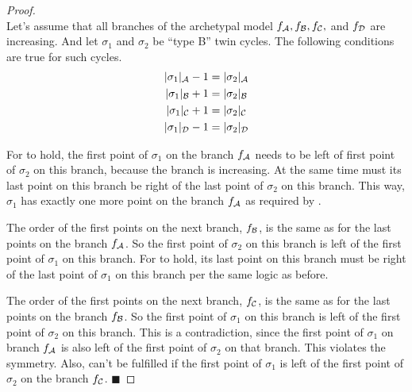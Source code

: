 \begin{proof} \phantom{x} \\
	Let's assume that all branches of the archetypal model $f_{\mathcal{A}}, f_{\mathcal{B}}, f_{\mathcal{C}},$ and $f_{\mathcal{D}}$ are increasing.
	And let $\sigma_1$ and $\sigma_2$ be ``type B'' twin cycles.
	The following conditions are true for such cycles.
	\begin{subequations}
		\begin{align}
			|\sigma_1|_{\mathcal{A}} - 1 & = |\sigma_2|_{\mathcal{A}} \label{equ:add.change.conseq.sigmaA} \\
			|\sigma_1|_{\mathcal{B}} + 1 & = |\sigma_2|_{\mathcal{B}} \label{equ:add.change.conseq.sigmaB} \\
			|\sigma_1|_{\mathcal{C}} + 1 & = |\sigma_2|_{\mathcal{C}} \label{equ:add.change.conseq.sigmaC} \\
			|\sigma_1|_{\mathcal{D}} - 1 & = |\sigma_2|_{\mathcal{D}} \label{equ:add.change.conseq.sigmaD}
		\end{align}
	\end{subequations}

	For  to hold, the first point of $\sigma_1$ on the branch $f_{\mathcal{A}}$ needs to be left of first point of $\sigma_2$ on this branch, because the branch is increasing.
	At the same time must its last point on this branch be right of the last point of $\sigma_2$ on this branch.
	This way, $\sigma_1$ has exactly one more point on the branch $f_{\mathcal{A}}$ as required by .

	The order of the first points on the next branch, $f_{\mathcal{B}}$, is the same as for the last points on the branch $f_{\mathcal{A}}$.
	So the first point of $\sigma_2$ on this branch is left of the first point of $\sigma_1$ on this branch.
	For  to hold, its last point on this branch must be right of the last point of $\sigma_1$ on this branch per the same logic as before.

	The order of the first points on the next branch, $f_{\mathcal{C}}$, is the same as for the last points on the branch $f_{\mathcal{B}}$.
	So the first point of $\sigma_1$ on this branch is left of the first point of $\sigma_2$ on this branch.
	This is a contradiction, since the first point of $\sigma_1$ on branch $f_{\mathcal{A}}$ is also left of the first point of $\sigma_2$ on that branch.
	This violates the symmetry.
	Also,  can't be fulfilled if the first point of $\sigma_1$ is left of the first point of $\sigma_2$ on the branch $f_{\mathcal{C}}$.
	\hfill $\blacksquare$
\end{proof}
